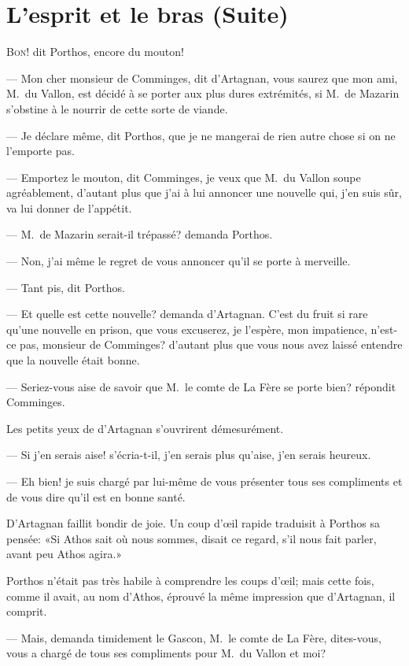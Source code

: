 \chapter{L'esprit et le bras (Suite)}

\lettrine[ante=—]{B}{on!} dit Porthos, encore du mouton!

\zz
— Mon cher monsieur de Comminges, dit d'Artagnan, vous saurez que mon ami, M.~du Vallon, est décidé à se porter aux plus dures extrémités, si M.~de Mazarin s'obstine à le nourrir de cette sorte de viande.

\zz
— Je déclare même, dit Porthos, que je ne mangerai de rien autre chose si on ne l'emporte pas.

— Emportez le mouton, dit Comminges, je veux que M.~du Vallon soupe agréablement, d'autant plus que j'ai à lui annoncer une nouvelle qui, j'en suis sûr, va lui donner de l'appétit.

— M.~de Mazarin serait-il trépassé? demanda Porthos.

— Non, j'ai même le regret de vous annoncer qu'il se porte à merveille.

— Tant pis, dit Porthos.

— Et quelle est cette nouvelle? demanda d'Artagnan. C'est du fruit si rare qu'une nouvelle en prison, que vous excuserez, je l'espère, mon impatience, n'est-ce pas, monsieur de Comminges? d'autant plus que vous nous avez laissé entendre que la nouvelle était bonne.

— Seriez-vous aise de savoir que M.~le comte de La Fère se porte bien? répondit Comminges.

Les petits yeux de d'Artagnan s'ouvrirent démesurément.

— Si j'en serais aise! s'écria-t-il, j'en serais plus qu'aise, j'en serais heureux.

— Eh bien! je suis chargé par lui-même de vous présenter tous ses compliments et de vous dire qu'il est en bonne santé.

D'Artagnan faillit bondir de joie. Un coup d'œil rapide traduisit à Porthos sa pensée: «Si Athos sait où nous sommes, disait ce regard, s'il nous fait parler, avant peu Athos agira.»

Porthos n'était pas très habile à comprendre les coups d'œil; mais cette fois, comme il avait, au nom d'Athos, éprouvé la même impression que d'Artagnan, il comprit.

— Mais, demanda timidement le Gascon, M.~le comte de La Fère, dites-vous, vous a chargé de tous ses compliments pour M.~du Vallon et moi?

